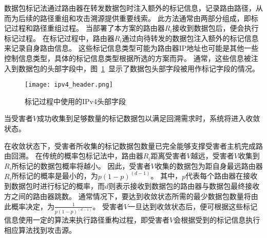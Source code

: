 数据包标记法通过路由器在转发数据包时注入额外的标记信息，记录路由路径，从而为后续的路径重组和攻击溯源提供重要线索。
此方法通常由两部分组成，即标记过程和路径重组过程。
当部署了本方案的路由器$R_i$接收到数据包后，便会执行标记过程。
在标记过程中，路由器$R_i$通过向待转发的数据包注入额外的标记信息来记录自身路由信息。
这些标记信息类型可能为路由器IP地址也可能是其他一些控制信息类型，具体的标记信息类型根据所选的方案而异。
通常，这些信息被注入到数据包的头部字段中，图~\ref{fig:ipv4_header}~显示了数据包头部字段被用作标记字段的情况。
\begin{figure}[htbp]
  \centering
  \texttt{[image: ipv4\_header.png]}
  \caption{标记过程中使用的IPv4头部字段}
  \label{fig:ipv4_header}
\end{figure}
当受害者$V$成功收集到足够数量的标记数据包以满足回溯需求时，系统将进入收敛状态。\par

在收敛状态下，受害者所收集的标记数据包数量已完全能够支撑受害者主机完成路由回溯。
在传统的概率包标记法中，路由器$R_i$距离受害者$V$越远，受害者$V$收集到$R_i$所标记的数据包概率将越小。
因此，受害者$V$收集的数据包为距自身最远路由器$R_i$所标记的概率是最小的，为$p(1-p)^(d-1)$。
其中，$p$代表每个路由器在接收到数据包时进行标记的概率，而$d$则表示接收到数据包的路由器与数据包最终接收方之间的路由器跳数。
通常情况下，要达到收敛状态所需的最少数据包数量将由此概率决定，为$\frac{1}{p(1-p)^(d-1)}$。
受害者$V$一旦达到收敛状态后，便可根据这些标记信息使用一定的算法来执行路径重构过程，即受害者$V$会根据受到的标记信息执行相应算法找到攻击源。

